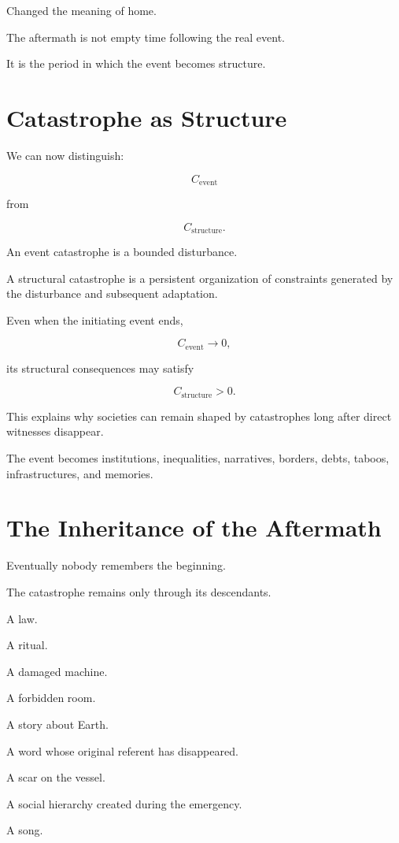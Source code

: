 \documentclass[11pt,oneside]{book}
\theoremstyle{definition}
\theoremstyle{remark}
\begin{document}
Changed the meaning of home.

The aftermath is not empty time following the real event.

It is the period in which the event becomes structure.

\section{Catastrophe as Structure}

We can now distinguish:

\[
C_{\mathrm{event}}
\]

from

\[
C_{\mathrm{structure}}.
\]

An event catastrophe is a bounded disturbance.

A structural catastrophe is a persistent organization of constraints generated by the disturbance and subsequent adaptation.

Even when the initiating event ends,

\[
C_{\mathrm{event}}\rightarrow0,
\]

its structural consequences may satisfy

\[
C_{\mathrm{structure}}>0.
\]

This explains why societies can remain shaped by catastrophes long after direct witnesses disappear.

The event becomes institutions, inequalities, narratives, borders, debts, taboos, infrastructures, and memories.

\section{The Inheritance of the Aftermath}

Eventually nobody remembers the beginning.

The catastrophe remains only through its descendants.

A law.

A ritual.

A damaged machine.

A forbidden room.

A story about Earth.

A word whose original referent has disappeared.

A scar on the vessel.

A social hierarchy created during the emergency.

A song.
\end{document}
